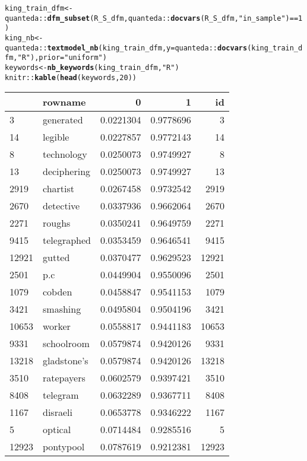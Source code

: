 \documentclass{article}\usepackage[]{graphicx}\usepackage[]{color}
\makeatletter
\newcommand{\hlnum}[1]{\textcolor[rgb]{0.686,0.059,0.569}{#1}}%
\newcommand{\hlstr}[1]{\textcolor[rgb]{0.192,0.494,0.8}{#1}}%
\newcommand{\hlopt}[1]{\textcolor[rgb]{0,0,0}{#1}}%
\newcommand{\hlstd}[1]{\textcolor[rgb]{0.345,0.345,0.345}{#1}}%
\newcommand{\hlkwb}[1]{\textcolor[rgb]{0.69,0.353,0.396}{#1}}%
\newcommand{\hlkwc}[1]{\textcolor[rgb]{0.333,0.667,0.333}{#1}}%
\newcommand{\hlkwd}[1]{\textcolor[rgb]{0.737,0.353,0.396}{\textbf{#1}}}%
\newenvironment{kframe}{%
 \def\at@end@of@kframe{}%
 \ifinner\ifhmode%
  \def\at@end@of@kframe{\end{minipage}}%
  \begin{minipage}{\columnwidth}%
 \fi\fi%
 \def\FrameCommand##1{\hskip\@totalleftmargin \hskip-\fboxsep
 \colorbox{shadecolor}{##1}\hskip-\fboxsep
     \hskip-\linewidth \hskip-\@totalleftmargin \hskip\columnwidth}%
 \MakeFramed {\advance\hsize-\width
   \@totalleftmargin\z@ \linewidth\hsize
   \@setminipage}}%
 {\par\unskip\endMakeFramed%
 \at@end@of@kframe}
\newenvironment{knitrout}{}{} %
\makeatother
\begin{document}
\begin{knitrout}
\begin{kframe}
\begin{alltt}
\hlstd{king_train_dfm}\hlkwb{<-}\hlstd{quanteda}\hlopt{::}\hlkwd{dfm_subset}\hlstd{(R_S_dfm, quanteda}\hlopt{::}\hlkwd{docvars}\hlstd{(R_S_dfm,} \hlstr{"in_sample"}\hlstd{)}\hlopt{==}\hlnum{1}\hlstd{)}
\hlstd{king_nb} \hlkwb{<-} \hlstd{quanteda}\hlopt{::}\hlkwd{textmodel_nb}\hlstd{(king_train_dfm,} \hlkwc{y}\hlstd{=quanteda}\hlopt{::}\hlkwd{docvars}\hlstd{(king_train_dfm,} \hlstr{"R"}\hlstd{),} \hlkwc{prior}\hlstd{=}\hlstr{"uniform"}\hlstd{)}
\hlstd{keywords}\hlkwb{<-}\hlkwd{nb_keywords}\hlstd{(king_train_dfm,} \hlstr{"R"}\hlstd{)}
\hlstd{knitr}\hlopt{::}\hlkwd{kable}\hlstd{(}\hlkwd{head}\hlstd{(keywords,} \hlnum{20}\hlstd{))}
\end{alltt}
\end{kframe}
\begin{tabular}{l|l|r|r|r}
\hline
  & rowname & 0 & 1 & id\\
\hline
3 & generated & 0.0221304 & 0.9778696 & 3\\
\hline
14 & legible & 0.0227857 & 0.9772143 & 14\\
\hline
8 & technology & 0.0250073 & 0.9749927 & 8\\
\hline
13 & deciphering & 0.0250073 & 0.9749927 & 13\\
\hline
2919 & chartist & 0.0267458 & 0.9732542 & 2919\\
\hline
2670 & detective & 0.0337936 & 0.9662064 & 2670\\
\hline
2271 & roughs & 0.0350241 & 0.9649759 & 2271\\
\hline
9415 & telegraphed & 0.0353459 & 0.9646541 & 9415\\
\hline
12921 & gutted & 0.0370477 & 0.9629523 & 12921\\
\hline
2501 & p.c & 0.0449904 & 0.9550096 & 2501\\
\hline
1079 & cobden & 0.0458847 & 0.9541153 & 1079\\
\hline
3421 & smashing & 0.0495804 & 0.9504196 & 3421\\
\hline
10653 & worker & 0.0558817 & 0.9441183 & 10653\\
\hline
9331 & schoolroom & 0.0579874 & 0.9420126 & 9331\\
\hline
13218 & gladstone's & 0.0579874 & 0.9420126 & 13218\\
\hline
3510 & ratepayers & 0.0602579 & 0.9397421 & 3510\\
\hline
8408 & telegram & 0.0632289 & 0.9367711 & 8408\\
\hline
1167 & disraeli & 0.0653778 & 0.9346222 & 1167\\
\hline
5 & optical & 0.0714484 & 0.9285516 & 5\\
\hline
12923 & pontypool & 0.0787619 & 0.9212381 & 12923\\
\hline
\end{tabular}


\end{knitrout}
\end{document}
